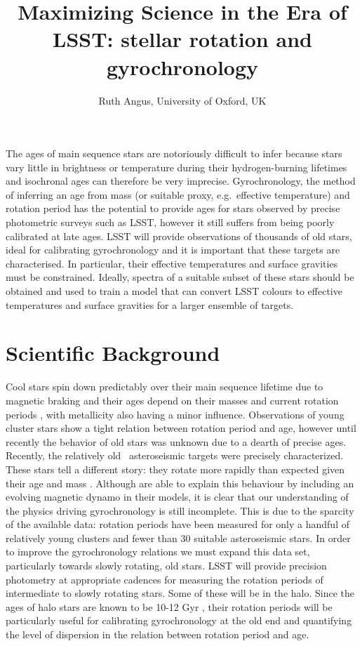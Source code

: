 \documentclass[letterpaper,11pt,preprint]{hack_aastex}
\author{Ruth Angus, University of Oxford, UK}
\begin{document}
\title{Maximizing Science in the Era of LSST: stellar rotation and
gyrochronology}

The ages of main sequence stars are notoriously difficult to infer because
stars vary little in brightness
or temperature during their hydrogen-burning lifetimes and isochronal ages
can therefore be very imprecise.
Gyrochronology, the method of inferring an age from mass (or suitable
proxy, e.g.\ effective temperature) and rotation period has the
potential to provide ages for stars observed by precise photometric surveys
such as LSST, however it still suffers from being poorly calibrated at late
ages.
LSST will provide observations of thousands of old stars, ideal for
calibrating gyrochronology and it is important that these targets are
characterised.
In particular, their effective temperatures and surface gravities must be
constrained.
Ideally, spectra of a suitable subset of these stars should be obtained and
used to train a model that can convert LSST colours to effective temperatures
and surface gravities for a larger ensemble of targets.

\section*{Scientific Background}
Cool stars spin down predictably over their main sequence lifetime due
to magnetic braking and their ages depend on their masses and current rotation
periods \citep[e.g.][]{skumanich, kawaler, barnes}, with metallicity also
having a minor influence.
Observations of young cluster stars show a tight relation between rotation
period and age, \citep{meibom} however until recently the behavior of old
stars was unknown due to a dearth of precise ages.
Recently, the relatively old \Kepler\ asteroseismic targets were precisely
characterized.
These stars tell a different story: they rotate more rapidly than
expected given their age and mass \citep{angus}.
Although \citet{vansaders} are able to explain this behaviour by including an
evolving magnetic dynamo in their models, it is clear that our understanding
of the physics driving gyrochronology is still incomplete.
This is due to the sparcity of the available data: rotation periods have been
measured for only a handful of relatively young clusters and fewer than 30
suitable asteroseismic stars.
In order to improve the gyrochronology relations we must expand this data set,
particularly towards slowly rotating, old stars.
LSST will provide precision photometry at appropriate cadences for
measuring the rotation periods of intermediate to slowly rotating stars.
Some of these will be in the halo.
Since the ages of halo stars are known to be 10-12 Gyr \citep[e.g.][]{jofre},
their rotation periods will be particularly useful for calibrating
gyrochronology at the old end and quantifying the level of dispersion in the
relation between rotation period and age.
\end{document}
